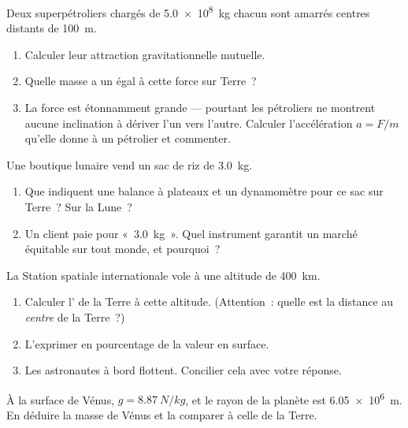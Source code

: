 \begin{exercise}[$\star\star$]\label{exo:g10:universal-gravitation:6}
Deux superpétroliers chargés de \qty{5.0e8}{kg} chacun sont amarrés
centres distants de \qty{100}{m}.
\begin{enumerate}
  \item Calculer leur attraction gravitationnelle mutuelle.
  \item Quelle masse a un  égal à cette force sur Terre~?
  \item La force est étonnamment grande --- pourtant les pétroliers ne
        montrent aucune inclination à dériver l'un vers l'autre.
        Calculer l'accélération $a = F/m$ qu'elle donne à un pétrolier
        et commenter.
\end{enumerate}
\end{exercise}

\begin{exercise}[$\star\star$]\label{exo:g10:universal-gravitation:7}
Une boutique lunaire vend un sac de riz de \qty{3.0}{kg}.
\begin{enumerate}
  \item Que indiquent une balance à plateaux et un dynamomètre pour ce
        sac sur Terre~? Sur la Lune~?
  \item Un client paie pour «~\qty{3.0}{kg}~». Quel instrument garantit
        un marché équitable sur tout monde, et pourquoi~?
\end{enumerate}
\end{exercise}

\begin{exercise}[$\star\star$]\label{exo:g10:universal-gravitation:8}
La Station spatiale internationale vole à une altitude de
\qty{400}{km}.
\begin{enumerate}
  \item Calculer l' de la
        Terre à cette altitude. (Attention~: quelle est la distance au
        \emph{centre} de la Terre~?)
  \item L'exprimer en pourcentage de la valeur en surface.
  \item Les astronautes à bord flottent. Concilier cela avec votre
        réponse.
\end{enumerate}
\end{exercise}

\begin{exercise}[$\star\star$]\label{exo:g10:universal-gravitation:9}
À la surface de Vénus, $g = \qty{8.87}{N/kg}$, et le rayon de la
planète est \qty{6.05e6}{m}. En déduire la masse de Vénus et la
comparer à celle de la Terre.
\end{exercise}

